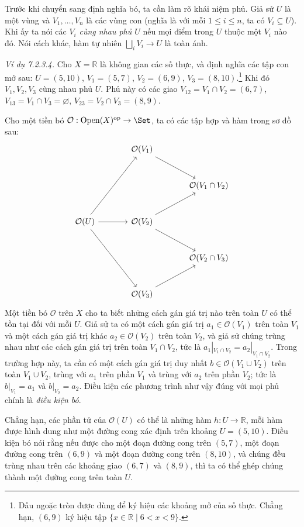 Trước khi chuyển sang định nghĩa bó, ta cần làm rõ khái niệm phủ. Giả sử $U$ là một vùng và $V_1,\ldots,V_n$ là các vùng con (nghĩa là với mỗi $1\le i\le n$, ta có $V_i\subseteq U$). Khi ấy ta nói các $V_i$ \emph{cùng nhau phủ $U$} nếu mọi điểm trong $U$ thuộc một $V_i$ nào đó. Nói cách khác, hàm tự nhiên $\bigsqcup_iV_i\to U$ là toàn ánh.

\noindent\textit{Ví dụ 7.2.3.4.}\keepwithnext
Cho $X=\mathbb R$ là không gian các số thực, và định nghĩa các tập con mở sau: $U=(5,10)$, $V_1=(5,7)$, $V_2=(6,9)$, $V_3=(8,10)$.\footnote{Dấu ngoặc tròn được dùng để ký hiệu các khoảng mở của số thực. Chẳng hạn, $(6,9)$ ký hiệu tập $\{x\in\mathbb R\mid6<x<9\}$.} Khi đó $V_1,V_2,V_3$ cùng nhau phủ $U$. Phủ này có các giao $V_{12}=V_1\cap V_2=(6,7)$, $V_{13}=V_1\cap V_3=\varnothing$, $V_{23}=V_2\cap V_3=(8,9)$.

Cho một tiền bó $\mathcal O:\operatorname{Open}(X)^{\mathrm{op}}\to\Set$, ta có các tập hợp và hàm trong sơ đồ sau:
\[
\begin{tikzcd}[column sep=large,row sep=large]
&\mathcal O(V_1)\arrow[dr]&\\
&&\mathcal O(V_1\cap V_2)\\
\mathcal O(U)\arrow[uur]\arrow[r]\arrow[ddr]&\mathcal O(V_2)\arrow[ur]\arrow[dr]&\\
&&\mathcal O(V_2\cap V_3)\\
&\mathcal O(V_3)\arrow[ur]&
\end{tikzcd}
\]
Một tiền bó $\mathcal O$ trên $X$ cho ta biết những cách gán giá trị nào trên toàn $U$ có thể tồn tại đối với mỗi $U$. Giả sử ta có một cách gán giá trị $a_1\in\mathcal O(V_1)$ trên toàn $V_1$ và một cách gán giá trị khác $a_2\in\mathcal O(V_2)$ trên toàn $V_2$, và giả sử chúng trùng nhau như các cách gán giá trị trên toàn $V_1\cap V_2$, tức là $a_1|_{V_1\cap V_2}=a_2|_{V_1\cap V_2}$. Trong trường hợp này, ta cần có một cách gán giá trị duy nhất $b\in\mathcal O(V_1\cup V_2)$ trên toàn $V_1\cup V_2$, trùng với $a_1$ trên phần $V_1$ và trùng với $a_2$ trên phần $V_2$; tức là $b|_{V_1}=a_1$ và $b|_{V_2}=a_2$. Điều kiện các phương trình như vậy đúng với mọi phủ chính là \emph{điều kiện bó}.

Chẳng hạn, các phần tử của $\mathcal O(U)$ có thể là những hàm $h:U\to\mathbb R$, mỗi hàm được hình dung như một đường cong xác định trên khoảng $U=(5,10)$. Điều kiện bó nói rằng nếu được cho một đoạn đường cong trên $(5,7)$, một đoạn đường cong trên $(6,9)$ và một đoạn đường cong trên $(8,10)$, và chúng đều trùng nhau trên các khoảng giao $(6,7)$ và $(8,9)$, thì ta có thể ghép chúng thành một đường cong trên toàn $U$.

